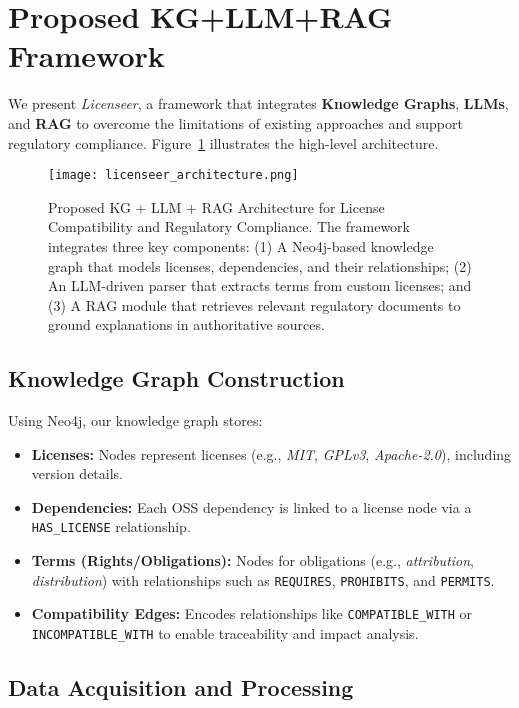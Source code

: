 \documentclass[12pt]{article}
\begin{document}
\section{Proposed KG+LLM+RAG Framework}
\label{sec:our_approach}
We present \textit{Licenseer}, a framework that integrates \textbf{Knowledge Graphs}, \textbf{LLMs}, and \textbf{RAG} to overcome the limitations of existing approaches and support regulatory compliance. Figure~\ref{fig:overall_arch} illustrates the high-level architecture.

\begin{figure}[H]
    \centering
    \texttt{[image: licenseer\_architecture.png]}
    \caption{Proposed KG + LLM + RAG Architecture for License Compatibility and Regulatory Compliance. The framework integrates three key components: (1) A Neo4j-based knowledge graph that models licenses, dependencies, and their relationships; (2) An LLM-driven parser that extracts terms from custom licenses; and (3) A RAG module that retrieves relevant regulatory documents to ground explanations in authoritative sources.}
    \label{fig:overall_arch}
\end{figure}

\subsection{Knowledge Graph Construction}
Using Neo4j, our knowledge graph stores:
\begin{itemize}
    \item \textbf{Licenses:} Nodes represent licenses (e.g., \emph{MIT}, \emph{GPLv3}, \emph{Apache-2.0}), including version details.
    \item \textbf{Dependencies:} Each OSS dependency is linked to a license node via a \texttt{HAS\_LICENSE} relationship.
    \item \textbf{Terms (Rights/Obligations):} Nodes for obligations (e.g., \emph{attribution}, \emph{distribution}) with relationships such as \texttt{REQUIRES}, \texttt{PROHIBITS}, and \texttt{PERMITS}.
    \item \textbf{Compatibility Edges:} Encodes relationships like \texttt{COMPATIBLE\_WITH} or \texttt{INCOMPATIBLE\_WITH} to enable traceability and impact analysis.
\end{itemize}

\subsection{Data Acquisition and Processing}
\label{sec:data_acquisition}
\end{document}
